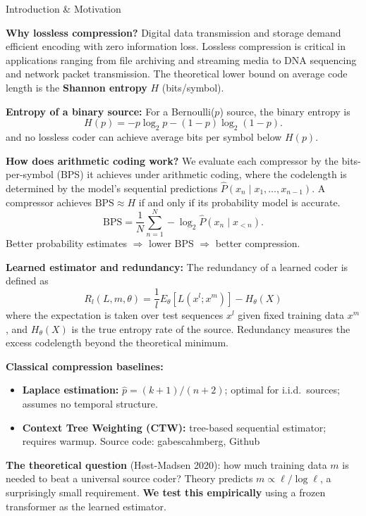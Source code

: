 \documentclass[final]{beamer}
\newlength{\leftcolwid}
\begin{document}
\begin{frame}[t]
\begin{columns}[t]
\begin{column}{\leftcolwid}
\begin{block}{Introduction \& Motivation}

\textbf{Why lossless compression?}
Digital data transmission and storage demand efficient encoding with zero information loss.
Lossless compression is critical in applications ranging from file archiving and 
streaming media to DNA sequencing and network packet transmission.
The theoretical lower bound on average code length is the \textbf{Shannon entropy} $H$ (bits/symbol).

\medskip
\textbf{Entropy of a binary source:}
For a Bernoulli($p$) source, the binary entropy is
\[
  H(p) = -p\log_2 p - (1-p)\log_2(1-p).
\]
and no lossless coder can achieve average bits per symbol below $H(p)$.

\medskip
\textbf{How does arithmetic coding work?}
We evaluate each compressor by the bits-per-symbol (BPS) it achieves under arithmetic coding, where the codelength is determined by the model's sequential predictions $\hat{P}(x_n \mid x_1, \ldots, x_{n-1})$. A compressor achieves $\text{BPS} \approx H$ if and only if its probability model is accurate.
\[
  \text{BPS} = \frac{1}{N}\sum_{n=1}^{N} -\log_2 \hat{P}(x_n \mid x_{<n}).
\]
Better probability estimates $\Rightarrow$ lower BPS $\Rightarrow$ better compression.

\medskip

\textbf{Learned estimator and redundancy:}
The redundancy of a learned coder is defined as
\[
    R_l(L, m, \theta) = \frac{1}{l} E_\theta[L(x^l; x^m)] - H_\theta(X)
\]
where the expectation is taken over test sequences $x^l$ given fixed training data $x^m$, 
and $H_\theta(X)$ is the true entropy rate of the source. Redundancy measures the 
excess codelength beyond the theoretical minimum.


\medskip
\textbf{Classical compression baselines:}
\begin{itemize}
  \item \textbf{Laplace estimation:} $\hat{p} = (k+1)/(n+2)$; optimal for i.i.d.\ sources; assumes no temporal structure.
  \item \textbf{Context Tree Weighting (CTW):} tree-based sequential estimator; requires warmup. Source code: gabescahmberg, Github 
\end{itemize}

\medskip
\textbf{The theoretical question} (H\o{}st-Madsen 2020): how much training data $m$ is needed
to beat a universal source coder? Theory predicts $m \propto \ell/\!\log\ell$, a surprisingly small requirement.
\textbf{We test this empirically} using a frozen transformer as the learned estimator.


\end{block}
\end{column}
\end{columns}
\end{frame}
\end{document}
